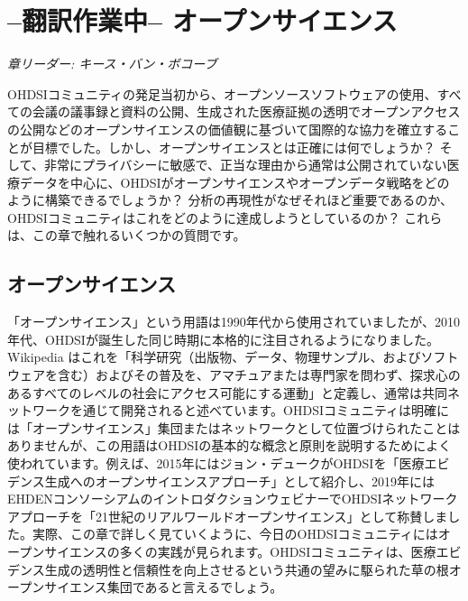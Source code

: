 \documentclass[
  11pt]{book}
\theoremstyle{definition}
\theoremstyle{definition}
\theoremstyle{definition}
\theoremstyle{definition}
\theoremstyle{remark}
\begin{document}
\chapter{--翻訳作業中-- オープンサイエンス}\label{OpenScience}


\emph{章リーダー: キース・バン・ボコーブ}

OHDSIコミュニティの発足当初から、オープンソースソフトウェアの使用、すべての会議の議事録と資料の公開、生成された医療証拠の透明でオープンアクセスの公開などのオープンサイエンスの価値観に基づいて国際的な協力を確立することが目標でした。しかし、オープンサイエンスとは正確には何でしょうか？ そして、非常にプライバシーに敏感で、正当な理由から通常は公開されていない医療データを中心に、OHDSIがオープンサイエンスやオープンデータ戦略をどのように構築できるでしょうか？ 分析の再現性がなぜそれほど重要であるのか、OHDSIコミュニティはこれをどのように達成しようとしているのか？ これらは、この章で触れるいくつかの質問です。

\section{オープンサイエンス}\label{ux30aaux30fcux30d7ux30f3ux30b5ux30a4ux30a8ux30f3ux30b9}

「オープンサイエンス」という用語は1990年代から使用されていましたが、2010年代、OHDSIが誕生した同じ時期に本格的に注目されるようになりました。Wikipedia \citep{wiki:Open_science} はこれを「科学研究（出版物、データ、物理サンプル、およびソフトウェアを含む）およびその普及を、アマチュアまたは専門家を問わず、探求心のあるすべてのレベルの社会にアクセス可能にする運動」と定義し、通常は共同ネットワークを通じて開発されると述べています。OHDSIコミュニティは明確には「オープンサイエンス」集団またはネットワークとして位置づけられたことはありませんが、この用語はOHDSIの基本的な概念と原則を説明するためによく使われています。例えば、2015年にはジョン・デュークがOHDSIを「医療エビデンス生成へのオープンサイエンスアプローチ」として紹介し、2019年にはEHDENコンソーシアムのイントロダクションウェビナーでOHDSIネットワークアプローチを「21世紀のリアルワールドオープンサイエンス」として称賛しました。実際、この章で詳しく見ていくように、今日のOHDSIコミュニティにはオープンサイエンスの多くの実践が見られます。OHDSIコミュニティは、医療エビデンス生成の透明性と信頼性を向上させるという共通の望みに駆られた草の根オープンサイエンス集団であると言えるでしょう。
\end{document}

